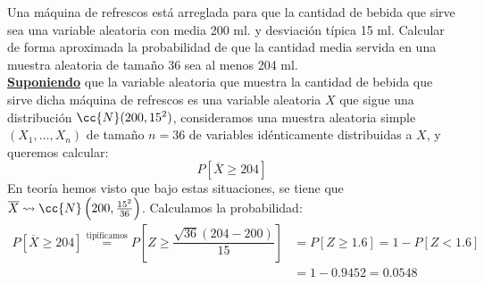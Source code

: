 \begin{ejercicio}   %
    Una máquina de refrescos está arreglada para que la cantidad de bebida que sirve sea una variable aleatoria con media 200 ml. y desviación típica 15 ml. Calcular de forma aproximada la probabilidad de que la cantidad media servida en una muestra aleatoria de tamaño 36 sea al menos 204 ml.\\

    \noindent
    \underline{\textbf{Suponiendo}} que la variable aleatoria que muestra la cantidad de bebida que sirve dicha máquina de refrescos es una variable aleatoria $X$ que sigue una distribución $\cc{N}(200, {15}^{2})$, consideramos una muestra aleatoria simple $(X_1, \ldots, X_n)$ de tamaño $n=36$ de variables idénticamente distribuidas a $X$, y queremos calcular:
    \begin{equation*}
        P[\overline{X}\geq 204]
    \end{equation*}
    En teoría hemos visto que bajo estas situaciones, se tiene que $\overline{X}\rightsquigarrow\cc{N}\left(200, \frac{15^2}{36}\right)$. Calculamos la probabilidad:
    \begin{align*}
        P[\overline{X}\geq 204] \stackrel{\text{tipificamos}}{=} P \left[Z \geq \dfrac{\sqrt{36}(204-200)}{15}\right] &= P[Z\geq 1.6] = 1 - P[Z< 1.6] \\
                                                                                                                      &= 1 - 0.9452 = 0.0548
    \end{align*}
\end{ejercicio}
